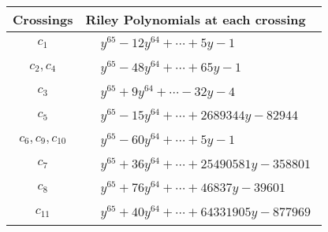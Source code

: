 \documentclass[1p]{elsarticle_modified}
\theoremstyle{definition}
\begin{document}
\begin{tabular}{m{50pt}|m{274pt}}
Crossings & \hspace{64pt}Riley Polynomials at each crossing \\
\hline $$\begin{aligned}c_{1}\end{aligned}$$&$\begin{aligned}
&y^{65}-12 y^{64}+\cdots+5 y-1
\end{aligned}$\\
\hline $$\begin{aligned}c_{2},c_{4}\end{aligned}$$&$\begin{aligned}
&y^{65}-48 y^{64}+\cdots+65 y-1
\end{aligned}$\\
\hline $$\begin{aligned}c_{3}\end{aligned}$$&$\begin{aligned}
&y^{65}+9 y^{64}+\cdots-32 y-4
\end{aligned}$\\
\hline $$\begin{aligned}c_{5}\end{aligned}$$&$\begin{aligned}
&y^{65}-15 y^{64}+\cdots+2689344 y-82944
\end{aligned}$\\
\hline $$\begin{aligned}c_{6},c_{9},c_{10}\end{aligned}$$&$\begin{aligned}
&y^{65}-60 y^{64}+\cdots+5 y-1
\end{aligned}$\\
\hline $$\begin{aligned}c_{7}\end{aligned}$$&$\begin{aligned}
&y^{65}+36 y^{64}+\cdots+25490581 y-358801
\end{aligned}$\\
\hline $$\begin{aligned}c_{8}\end{aligned}$$&$\begin{aligned}
&y^{65}+76 y^{64}+\cdots+46837 y-39601
\end{aligned}$\\
\hline $$\begin{aligned}c_{11}\end{aligned}$$&$\begin{aligned}
&y^{65}+40 y^{64}+\cdots+64331905 y-877969
\end{aligned}$\\
\hline
\end{tabular}\\~\\
\end{document}
